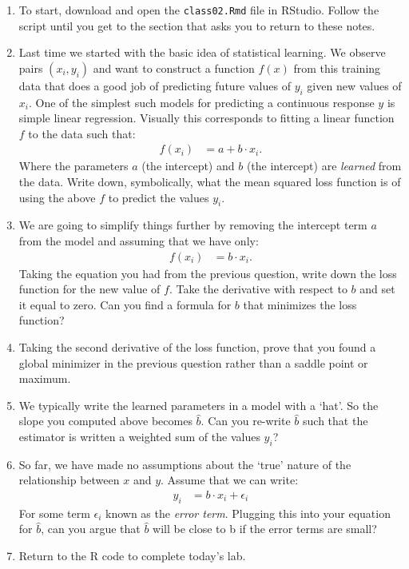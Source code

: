 \documentclass[12pt,hidelinks]{article}
\numberwithin{equation}{section}
\begin{document}
\begin{enumerate}
\item To start, download and open the \verb|class02.Rmd| file in RStudio.
Follow the script until you get to the section that asks you to return to
these notes.
\item Last time we started with the basic idea of statistical learning. We
observe pairs $(x_i, y_i)$ and want to construct a function $f(x)$ from this
training data that does a good job of predicting future values of $y_i$ given
new values of $x_i$. One of the simplest such models for predicting a
continuous response $y$ is simple linear regression. Visually this corresponds
to fitting a linear function $f$ to the data such that:
\begin{align}
f(x_i) &= a + b \cdot x_i.
\end{align}
Where the parameters $a$ (the intercept) and $b$ (the intercept) are
\textit{learned} from the data. Write down, symbolically, what the mean
squared loss function is of using the above $f$ to predict the values $y_i$.
\item We are going to simplify things further by removing the intercept term
$a$ from the model and assuming that we have only:
\begin{align}
f(x_i) &= b \cdot x_i.
\end{align}
Taking the equation you had from the previous question, write down the loss
function for the new value of $f$. Take the derivative with respect to $b$
and set it equal to zero. Can you find a formula for $b$ that minimizes the
loss function?
\item Taking the second derivative of the loss function, prove that you found
a global minimizer in the previous question rather than a saddle point or
maximum.
\item We typically write the learned parameters in a model with a `hat'. So
the slope you computed above becomes $\widehat{b}$. Can you re-write $\widehat{b}$
such that the estimator is written a weighted sum of the values $y_i$?
\item So far, we have made no assumptions about the `true' nature of the
relationship between $x$ and $y$. Assume that we can write:
\begin{align}
y_i &= b \cdot x_i + \epsilon_i
\end{align}
For some term $\epsilon_i$ known as the \textit{error term}. Plugging this into
your equation for $\widehat{b}$, can you argue that $\widehat{b}$ will be close
to b if the error terms are small?
\item Return to the R code to complete today's lab.
\end{enumerate}
\end{document}
